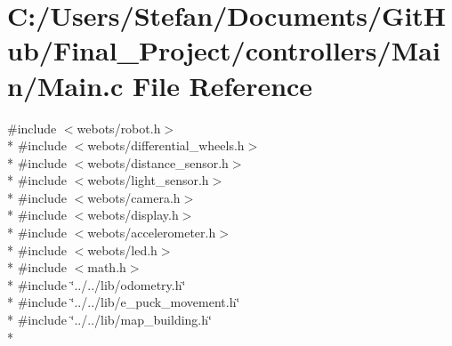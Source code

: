 \section{C\-:/\-Users/\-Stefan/\-Documents/\-Git\-Hub/\-Final\-\_\-\-Project/controllers/\-Main/\-Main.c File Reference}
\label{_main_8c}
{\ttfamily \#include $<$webots/robot.\-h$>$}\\*
{\ttfamily \#include $<$webots/differential\-\_\-wheels.\-h$>$}\\*
{\ttfamily \#include $<$webots/distance\-\_\-sensor.\-h$>$}\\*
{\ttfamily \#include $<$webots/light\-\_\-sensor.\-h$>$}\\*
{\ttfamily \#include $<$webots/camera.\-h$>$}\\*
{\ttfamily \#include $<$webots/display.\-h$>$}\\*
{\ttfamily \#include $<$webots/accelerometer.\-h$>$}\\*
{\ttfamily \#include $<$webots/led.\-h$>$}\\*
{\ttfamily \#include $<$math.\-h$>$}\\*
{\ttfamily \#include \char`\"{}../../lib/odometry.\-h\char`\"{}}\\*
{\ttfamily \#include \char`\"{}../../lib/e\-\_\-puck\-\_\-movement.\-h\char`\"{}}\\*
{\ttfamily \#include \char`\"{}../../lib/map\-\_\-building.\-h\char`\"{}}\\*
